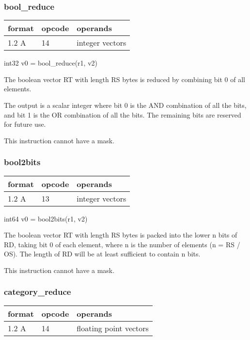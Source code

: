 \documentclass[forwardcom.tex]{subfiles}
\begin{document}
\subsubsection{bool\_reduce}
\label{table:boolReduceInstruction}
\begin{tabular}{|p{12mm}|p{12mm}|p{110mm}|}
\hline
\bfseries format & \bfseries opcode & \bfseries operands \\ \hline
1.2 A & 14 & integer vectors \\ \hline
\end{tabular}
\vspace{2mm}

int32 v0 = bool\_reduce(r1, v2)
\vspace{2mm}

The boolean vector RT with length RS bytes is reduced by combining bit 0 of all elements.

The output is a scalar integer where bit 0 is the AND combination of all the bits, and bit
1 is the OR combination of all the bits. The remaining bits are reserved for future use.
\vspace{2mm}

This instruction cannot have a mask.


\subsubsection{bool2bits}
\label{table:bool2bitsInstruction}
\begin{tabular}{|p{12mm}|p{12mm}|p{110mm}|}
\hline
\bfseries format & \bfseries opcode & \bfseries operands \\ \hline
1.2 A & 13 & integer vectors \\ \hline
\end{tabular}
\vspace{2mm}

int64 v0 = bool2bits(r1, v2)
\vspace{2mm}

The boolean vector RT with length RS bytes is packed into the lower n bits of RD, taking bit 0 of each element, where n is the number of elements (n = RS / OS). 
The length of RD will be at least sufficient to contain n bits.
\vspace{2mm}

This instruction cannot have a mask.
\vspace{2mm}

\subsubsection{category\_reduce}
\label{table:categoryReduceInstruction}
\begin{tabular}{|p{12mm}|p{12mm}|p{110mm}|}
\hline
\bfseries format & \bfseries opcode & \bfseries operands \\ \hline
1.2 A & 14 & floating point vectors \\ \hline
\end{tabular}
\vspace{2mm}
\end{document}
